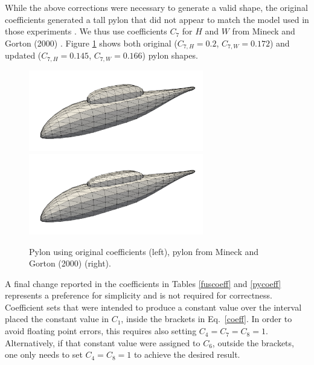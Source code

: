 \documentclass[journal]{new-aiaa}
\begin{document}
While the above corrections were necessary to generate a valid shape, the original coefficients generated a 
tall pylon that did not appear to match the model used in those experiments \cite{nasa80051,nasa87762}.
We thus use coefficients $C_{7}$ for $H$ and $W$ from Mineck and Gorton (2000) \cite{mineckgorton}.
Figure \ref{badpylon} shows both original ($C_{7,H} = 0.2$, $C_{7,W} = 0.172$) and
updated ($C_{7,H} = 0.145$, $C_{7,W} = 0.166$) pylon shapes.
\begin{figure} \begin{centering}
\includegraphics[width=3.0in]{img_badpylon.png}
\includegraphics[width=3.0in]{img_good.png}
\caption{Pylon using original coefficients \cite{nasa80051,nasa87762} (left), pylon from Mineck and Gorton (2000) \cite{mineckgorton} (right).}
\label{badpylon}
\end{centering}\end{figure}%

A final change reported in the coefficients in Tables \ref{fuscoeff} and \ref{pycoeff} represents a preference
for simplicity and is not required for correctness.
Coefficient sets that were intended to produce a constant value over the interval placed the constant value in $C_1$,
inside the brackets in Eq.~\ref{coeff}. In order to avoid floating point errors, this requires also setting
$C_4 = C_7 = C_8 = 1$. Alternatively, if that constant value were assigned to $C_6$, outside the brackets, one only
needs to set $C_4 = C_8 = 1$ to achieve the desired result.
\end{document}
